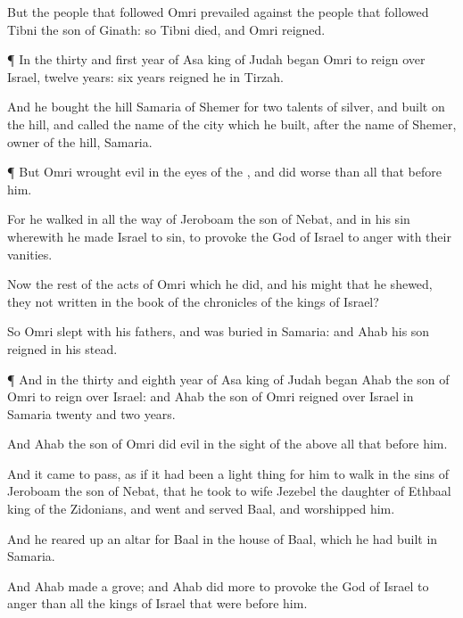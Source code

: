 {But the
people that
followed
Omri
prevailed
against the
people that
followed
Tibni the
son of
Ginath: so
Tibni
died, and
Omri
reigned.


\par }{\PP {}¶ In the
thirty and
first
year of
Asa
king of
Judah began
Omri to
reign over
Israel,
twelve
years:
six
years
reigned he in
Tirzah.

And he
bought the
hill
Samaria of
Shemer for two
talents of
silver, and
built on the
hill, and
called the
name of the
city which he
built, after the
name of
Shemer,
owner of the
hill,
Samaria.


\par }{\PP {}¶ But
Omri
wrought
evil in the
eyes of the
{}, and did
worse than all that
{}
before him.

For he
walked in all the
way of
Jeroboam the
son of
Nebat, and in his
sin wherewith he made
Israel to
sin, to provoke the
{}
God of
Israel to
anger with their
vanities.

Now the
rest of the
acts of
Omri which he
did, and his
might that he
shewed,
{} they not
written in the
book of the
chronicles of the
kings of
Israel?

So
Omri
slept with his
fathers, and was
buried in
Samaria: and
Ahab his
son
reigned in his stead.


\par }{\PP {}¶ And in the
thirty and
eighth
year of
Asa
king of
Judah began
Ahab the
son of
Omri to
reign over
Israel: and
Ahab the
son of
Omri
reigned over
Israel in
Samaria
twenty and
two
years.

And
Ahab the
son of
Omri
did
evil in the
sight of the
{} above all that
{}
before him.

And it came to pass, as if it had been a light
thing for him to
walk in the
sins of
Jeroboam the
son of
Nebat, that he
took to
wife
Jezebel the
daughter of
Ethbaal
king of the
Zidonians, and
went and
served
Baal, and
worshipped him.

And he reared
up an
altar for
Baal in the
house of
Baal, which he had
built in
Samaria.

And
Ahab
made a
grove; and
Ahab
did
more to provoke the
{}
God of
Israel to
anger than all the
kings of
Israel that were
before him.


}
